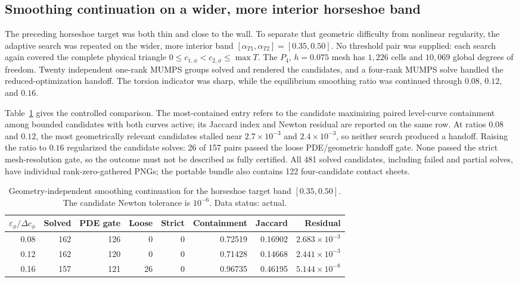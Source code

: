 \subsection{Smoothing continuation on a wider, more interior horseshoe band}
\label{sec:horseshoe-interior-epsilon-continuation}

The preceding horseshoe target was both thin and close to the wall.  To
separate that geometric difficulty from nonlinear regularity, the adaptive
search was repeated on the wider, more interior band
$[\alpha_{T1},\alpha_{T2}]=[0.35,0.50]$.  No threshold pair was supplied:
each search again covered the complete physical triangle
$0\leq c_{1,\phi}<c_{2,\phi}\leq\max T$.  The $P_4$, $h=0.075$ mesh has
$1{,}226$ cells and $10{,}069$ global degrees of freedom.  Twenty independent
one-rank MUMPS groups solved and rendered the candidates, and a four-rank
MUMPS solve handled the reduced-optimization handoff.  The torsion indicator
was sharp, while the equilibrium smoothing ratio was continued through
$0.08$, $0.12$, and $0.16$.

Table~\ref{tab:horseshoe-interior-epsilon-continuation} gives the controlled
comparison.  The most-contained entry refers to the candidate maximizing paired
level-curve containment among bounded candidates with both curves active; its
Jaccard index and Newton residual are reported on the same row.  At ratios
$0.08$ and $0.12$, the most geometrically relevant candidates stalled near
$2.7\times10^{-3}$ and $2.4\times10^{-3}$, so neither search produced a
handoff.  Raising the ratio to $0.16$ regularized the candidate solves: 26 of
157 pairs passed the loose PDE/geometric handoff gate.  None passed the strict
mesh-resolution gate, so the outcome must not be described as fully
certified.  All 481 solved candidates, including failed and partial solves,
have individual rank-zero-gathered PNGs; the portable bundle also contains
122 four-candidate contact sheets.

\begin{table}[tbp]
\centering
\caption{Geometry-independent smoothing continuation for the horseshoe target
band $[0.35,0.50]$.  The candidate Newton tolerance is $10^{-6}$.  Data
status: actual.}
\label{tab:horseshoe-interior-epsilon-continuation}
\begin{tabular}{rrrrrrrr}
\toprule
$\varepsilon_\phi/\Delta c_\phi$ & Solved & PDE gate & Loose & Strict &
Containment & Jaccard & Residual \\
\midrule
0.08 & 162 & 126 & 0  & 0 & 0.72519 & 0.16902 & $2.683\times10^{-3}$ \\
0.12 & 162 & 120 & 0  & 0 & 0.71428 & 0.14668 & $2.441\times10^{-3}$ \\
0.16 & 157 & 121 & 26 & 0 & 0.96735 & 0.46195 & $5.144\times10^{-8}$ \\
\bottomrule
\end{tabular}
\end{table}


